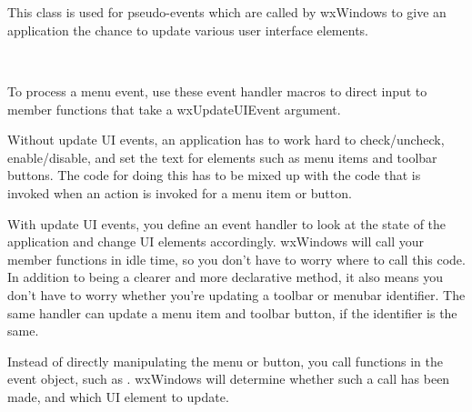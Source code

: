 \section{}\label{wxupdateuievent}

This class is used for pseudo-events which are called by wxWindows
to give an application the chance to update various user interface elements.


\\


To process a menu event, use these event handler macros to direct input to member
functions that take a wxUpdateUIEvent argument.

\twocolwidtha{7cm}
\begin{twocollist}\itemsep=0pt
\end{twocollist}%


Without update UI events, an application has to work hard to check/uncheck, enable/disable,
and set the text for elements such as menu items and toolbar buttons.
The code for doing this has to be mixed up with the code that is invoked when
an action is invoked for a menu item or button.

With update UI events, you define an event handler to look at the state of
the application and change UI elements accordingly. wxWindows will call your
member functions in idle time, so you don't have to worry where to call this code.
In addition to being a clearer and more declarative method, it also means you
don't have to worry whether you're updating a toolbar or menubar identifier.
The same handler can update a menu item and toolbar button, if the identifier is the same.

Instead of directly manipulating the menu or button, you call functions in the event
object, such as . wxWindows
will determine whether such a call has been made, and which UI element to update.




